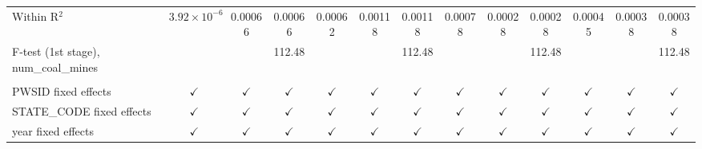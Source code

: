 \begin{table}[htbp]
\begin{adjustbox}{width = \textwidth, center}
\begin{tabular}{lcccccccccccc}
         Within R$^2$                           & $3.92\times 10^{-6}$  & 0.00066       & 0.00066       & 0.00062       & 0.00118        & 0.00118       & 0.00078       & 0.00028       & 0.00028       & 0.00045       & 0.00038       & 0.00038\\  
         F-test (1st stage), num\_coal\_mines   &                       &               & 112.48        &               &                & 112.48        &               &               & 112.48        &               &               & 112.48\\  
          \\
         PWSID fixed effects                    & $\checkmark$          & $\checkmark$  & $\checkmark$  & $\checkmark$  & $\checkmark$   & $\checkmark$  & $\checkmark$  & $\checkmark$  & $\checkmark$  & $\checkmark$  & $\checkmark$  & $\checkmark$\\   
         STATE\_CODE fixed effects              & $\checkmark$          & $\checkmark$  & $\checkmark$  & $\checkmark$  & $\checkmark$   & $\checkmark$  & $\checkmark$  & $\checkmark$  & $\checkmark$  & $\checkmark$  & $\checkmark$  & $\checkmark$\\   
         year fixed effects                     & $\checkmark$          & $\checkmark$  & $\checkmark$  & $\checkmark$  & $\checkmark$   & $\checkmark$  & $\checkmark$  & $\checkmark$  & $\checkmark$  & $\checkmark$  & $\checkmark$  & $\checkmark$\\   
         \bottomrule
      \end{tabular}
   \end{adjustbox}
\end{table}


